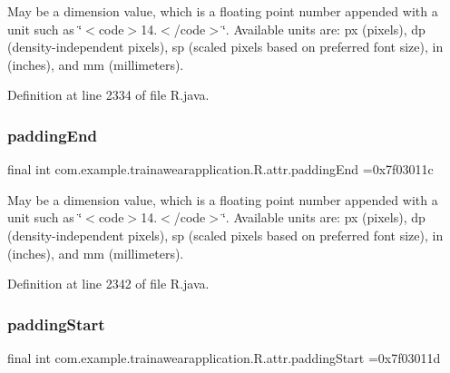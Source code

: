 May be a dimension value, which is a floating point number appended with a unit such as \char`\"{}$<$code$>$14.\+5sp$<$/code$>$\char`\"{}. Available units are\+: px (pixels), dp (density-\/independent pixels), sp (scaled pixels based on preferred font size), in (inches), and mm (millimeters). 

Definition at line 2334 of file R.\+java.

\mbox{\label{classcom_1_1example_1_1trainawearapplication_1_1_r_1_1attr_a489d6d66db2bc9add2631811bda8f237}} 
\subsubsection{\texorpdfstring{paddingEnd}{paddingEnd}}
{\footnotesize\ttfamily final int com.\+example.\+trainawearapplication.\+R.\+attr.\+padding\+End =0x7f03011c\hspace{0.3cm}{\ttfamily [static]}}

May be a dimension value, which is a floating point number appended with a unit such as \char`\"{}$<$code$>$14.\+5sp$<$/code$>$\char`\"{}. Available units are\+: px (pixels), dp (density-\/independent pixels), sp (scaled pixels based on preferred font size), in (inches), and mm (millimeters). 

Definition at line 2342 of file R.\+java.

\mbox{\label{classcom_1_1example_1_1trainawearapplication_1_1_r_1_1attr_abca22fbbfcdd1f3a76098fbd249eb76e}} 
\subsubsection{\texorpdfstring{paddingStart}{paddingStart}}
{\footnotesize\ttfamily final int com.\+example.\+trainawearapplication.\+R.\+attr.\+padding\+Start =0x7f03011d\hspace{0.3cm}{\ttfamily [static]}}

